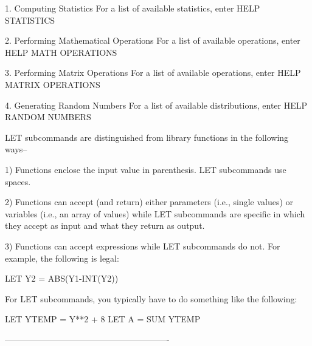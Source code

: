    1. Computing Statistics
      For a list of available statistics, enter HELP STATISTICS
 
   2. Performing Mathematical Operations
      For a list of available operations, enter HELP MATH OPERATIONS
 
   3. Performing Matrix Operations
      For a list of available operations, enter HELP MATRIX OPERATIONS
 
   4. Generating Random Numbers
      For a list of available distributions, enter HELP RANDOM NUMBERS
 
LET subcommands are distinguished from library functions in the
following ways--
 
   1) Functions enclose the input value in parenthesis.  LET
      subcommands use spaces.
 
   2) Functions can accept (and return) either parameters (i.e., single
      values) or variables (i.e., an array of values) while LET
      subcommands are specific in which they accept as input and what
      they return as output.
 
   3) Functions can accept expressions while LET subcommands do not.
      For example, the following is legal:
 
         LET Y2 = ABS(Y1-INT(Y2))
 
      For LET subcommands, you typically have to do something like the
      following:
 
         LET YTEMP = Y**2 + 8
         LET A = SUM YTEMP
 
----------------------------------------------------------
 
 
 
 
 
 
 
 
 
 
 
 
 
 
 
 
 
 
 
 
 
 
 
 
 
 
 
 
 
 
 
 
 
 
 
 
 
 
 
 
 
 
 
 
 
